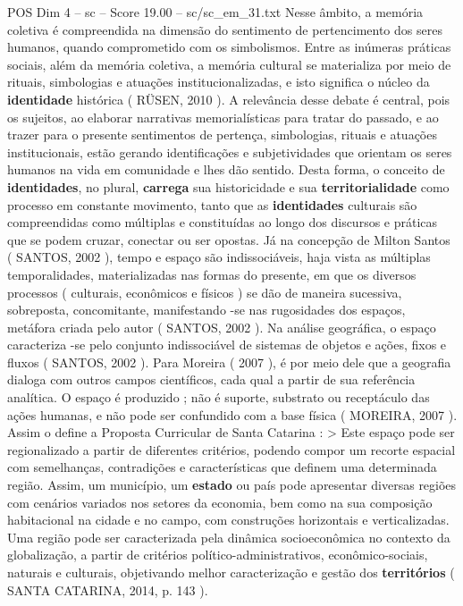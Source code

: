 \begin{textsample}{POS Dim 4 – sc – Score 19.00 – sc/sc\_em\_31.txt}
Nesse âmbito, a memória coletiva é compreendida na dimensão do sentimento de pertencimento dos seres humanos, quando comprometido com os simbolismos.
Entre as inúmeras práticas sociais, além da memória coletiva, a memória cultural se materializa por meio de rituais, simbologias e atuações institucionalizadas, e isto significa o núcleo da \textbf{identidade} histórica ( RÜSEN, 2010 ).
A relevância desse debate é central, pois os sujeitos, ao elaborar narrativas memorialísticas para tratar do passado, e ao trazer para o presente sentimentos de pertença, simbologias, rituais e atuações institucionais, estão gerando identificações e subjetividades que orientam os seres humanos na vida em comunidade e lhes dão sentido.
Desta forma, o conceito de \textbf{identidades}, no plural, \textbf{carrega} sua historicidade e sua \textbf{territorialidade} como processo em constante movimento, tanto que as \textbf{identidades} culturais são compreendidas como múltiplas e constituídas ao longo dos discursos e práticas que se podem cruzar, conectar ou ser opostas.
Já na concepção de Milton Santos ( SANTOS, 2002 ), tempo e espaço são indissociáveis, haja vista as múltiplas temporalidades, materializadas nas formas do presente, em que os diversos processos ( culturais, econômicos e físicos ) se dão de maneira sucessiva, sobreposta, concomitante, manifestando -se nas rugosidades dos espaços, metáfora criada pelo autor ( SANTOS, 2002 ).
Na análise geográfica, o espaço caracteriza -se pelo conjunto indissociável de sistemas de objetos e ações, fixos e fluxos ( SANTOS, 2002 ).
Para Moreira ( 2007 ), é por meio dele que a geografia dialoga com outros campos científicos, cada qual a partir de sua referência analítica.
O espaço é produzido ; não é suporte, substrato ou receptáculo das ações humanas, e não pode ser confundido com a base física ( MOREIRA, 2007 ).
Assim o define a Proposta Curricular de Santa Catarina : > Este espaço pode ser regionalizado a partir de diferentes critérios, podendo compor um recorte espacial com semelhanças, contradições e características que definem uma determinada região.
Assim, um município, um \textbf{estado} ou país pode apresentar diversas regiões com cenários variados nos setores da economia, bem como na sua composição habitacional na cidade e no campo, com construções horizontais e verticalizadas.
Uma região pode ser caracterizada pela dinâmica socioeconômica no contexto da globalização, a partir de critérios político-administrativos, econômico-sociais, naturais e culturais, objetivando melhor caracterização e gestão dos \textbf{territórios} ( SANTA CATARINA, 2014, p. 143 ).

\end{textsample}
